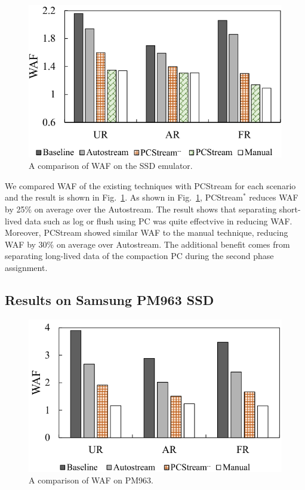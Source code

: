 \begin{figure}[t]
	\centering
	\includegraphics[width=1\linewidth]{figure/result_emul.pdf}
	\vspace{-15pt}
	\caption{A comparison of WAF on the SSD emulator.}
	\label{fig:result_emul}
	\vspace{-15pt}
\end{figure}

We compared WAF of the existing techniques with {\sf PCStream}
for each scenario and the result is shown in Fig.~\ref{fig:result_emul}. 
As shown in Fig.~\ref{fig:result_emul}, 
{\sf PCStream}$^{*}$ reduces WAF by 25\% on average over the {\sf Autostream}. 
The result shows that separating short-lived data such as log or flush
using PC was quite effectvive in reducing WAF.
Moreover, {\sf PCStream} showed similar WAF to the {\sf manual} technique,
reducing WAF by 30\% on average
over {\sf Autostream}.
The additional benefit comes from separating
long-lived data of the compaction PC during the
second phase assignment.

\subsection{Results on Samsung PM963 SSD}
\begin{figure}[t]
	\centering
	\includegraphics[width=1\linewidth]{figure/result_ssd.pdf}
	\vspace{-15pt}
	\caption{A comparison of WAF on PM963.}
	\label{fig:result_SSD}
	\vspace{-15pt}
\end{figure}

